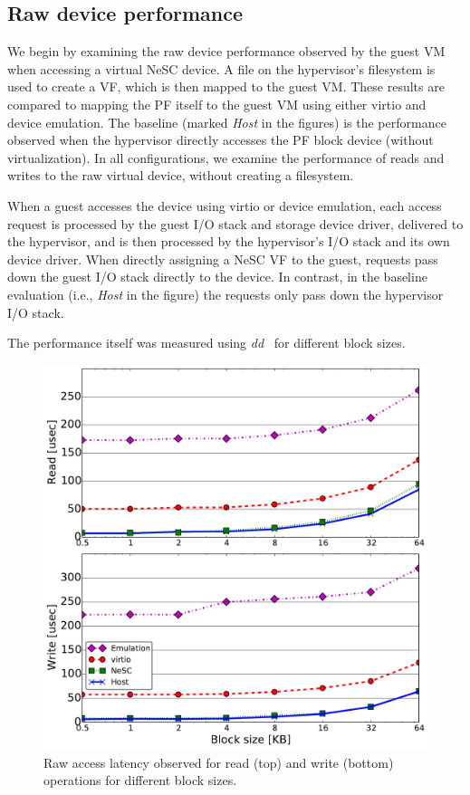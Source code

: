 \subsection{Raw device performance}

We begin by examining the raw device performance observed by the guest VM when accessing a virtual NeSC device. A file on the hypervisor's filesystem is used to create a VF, which is then mapped to the guest VM. These results are compared to mapping the PF itself to the guest VM using either virtio and device emulation. The baseline (marked \emph{Host} in the figures) is the performance observed when the hypervisor directly accesses the PF block device (without virtualization).
In all configurations, we examine the performance of reads and writes to the raw virtual device, without creating a filesystem. 

When a guest accesses the device using virtio or device emulation, each access  request is processed by the guest I/O stack and storage device driver, delivered to the hypervisor, and is then processed by the hypervisor's I/O stack and its own device driver.
When directly assigning a NeSC VF to the guest, requests pass down the guest I/O stack directly to the device. In contrast, in the baseline evaluation (i.e., \emph{Host} in the figure) the requests only pass down the hypervisor I/O stack.

The performance itself was measured using \emph{dd}~\cite{coreutils} for different block sizes.

\begin{figure}[t]
  \vspace{-1.4ex}
  \centering
  \includegraphics[width=1\columnwidth]{figs/latency_block_size.pdf}
  \caption{Raw access latency observed for read (top) and write (bottom) operations for different block sizes.}
  \label{fig:latency}
\end{figure}

